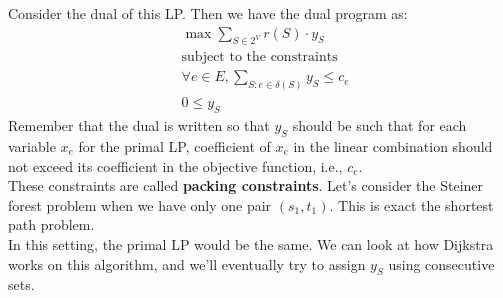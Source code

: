 \documentclass[a4paper]{article}
\newcommand{\nl}{\vspace{0.2cm}\\}
\begin{document}
Consider the dual of this LP. Then we have the dual program as:
\begin{align*}
    &\max \sum_{S \in 2^V} r(S) \cdot y_S\\
    &\text{subject to the constraints}\\
    &\forall e \in E, \sum_{S : e \in \delta(S)} y_S \le c_e\\
    &0 \le y_S
\end{align*}
Remember that the dual is written so that $y_S$ should be such that for each variable $x_e$ for the primal LP, coefficient of $x_e$ in the linear combination should not exceed its coefficient in
the objective function, i.e., $c_e$.\nl
These constraints are called \textbf{packing constraints}. Let's consider the Steiner forest problem when we have only one pair $(s_1, t_1)$. This is exact the shortest path problem.\nl
In this setting, the primal LP would be the same. We can look at how Dijkstra works on this algorithm, and we'll eventually try to assign $y_S$ using consecutive sets.
\end{document}
